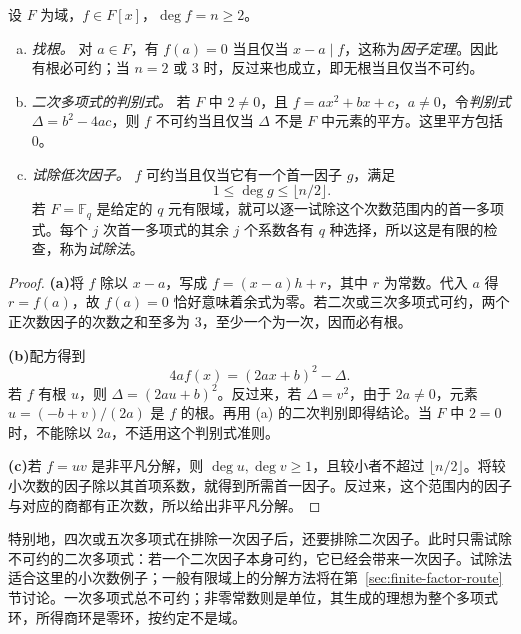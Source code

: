 \documentclass[lang=cn,a4paper,fontset=none,zihao=false,10pt,openany,twoside]{beautybook}
\numberwithin{algorithm}{chapter}
\begin{document}
\begin{proposition}[多项式不可约性的初等判别]\label{prop:elementary-irreducibility}
设 $F$ 为域，$f\in F[x]$，$\deg f=n\ge2$。
\begin{enumerate}[(a)]
\item \emph{找根。} 对 $a\in F$，有 $f(a)=0$ 当且仅当 $x-a\mid f$，这称为\emph{因子定理}。因此有根必可约；当 $n=2$ 或 $3$ 时，反过来也成立，即无根当且仅当不可约。
\item \emph{二次多项式的判别式。} 若 $F$ 中 $2\ne0$，且 $f=ax^2+bx+c$，$a\ne0$，令\emph{判别式} $\Delta=b^2-4ac$，则 $f$ 不可约当且仅当 $\Delta$ 不是 $F$ 中元素的平方。这里平方包括 $0$。
\item \emph{试除低次因子。} $f$ 可约当且仅当它有一个首一因子 $g$，满足
\[
 1\le\deg g\le\lfloor n/2\rfloor.
\]
若 $F=\mathbb F_q$ 是给定的 $q$ 元有限域，就可以逐一试除这个次数范围内的首一多项式。每个 $j$ 次首一多项式的其余 $j$ 个系数各有 $q$ 种选择，所以这是有限的检查，称为\emph{试除法}。
\end{enumerate}
\end{proposition}
\begin{proof}
\par\smallskip\noindent\textbf{(a)}\quad 将 $f$ 除以 $x-a$，写成 $f=(x-a)h+r$，其中 $r$ 为常数。代入 $a$ 得 $r=f(a)$，故 $f(a)=0$ 恰好意味着余式为零。若二次或三次多项式可约，两个正次数因子的次数之和至多为 $3$，至少一个为一次，因而必有根。

\par\smallskip\noindent\textbf{(b)}\quad 配方得到
\[
 4a f(x)=(2ax+b)^2-\Delta.
\]
若 $f$ 有根 $u$，则 $\Delta=(2au+b)^2$。反过来，若 $\Delta=v^2$，由于 $2a\ne0$，元素 $u=(-b+v)/(2a)$ 是 $f$ 的根。再用 (a) 的二次判别即得结论。当 $F$ 中 $2=0$ 时，不能除以 $2a$，不适用这个判别式准则。

\par\smallskip\noindent\textbf{(c)}\quad 若 $f=uv$ 是非平凡分解，则 $\deg u,\deg v\ge1$，且较小者不超过 $\lfloor n/2\rfloor$。将较小次数的因子除以其首项系数，就得到所需首一因子。反过来，这个范围内的因子与对应的商都有正次数，所以给出非平凡分解。
\end{proof}

特别地，四次或五次多项式在排除一次因子后，还要排除二次因子。此时只需试除不可约的二次多项式：若一个二次因子本身可约，它已经会带来一次因子。试除法适合这里的小次数例子；一般有限域上的分解方法将在第~\ref{sec:finite-factor-route} 节讨论。一次多项式总不可约；非零常数则是单位，其生成的理想为整个多项式环，所得商环是零环，按约定不是域。
\end{document}
